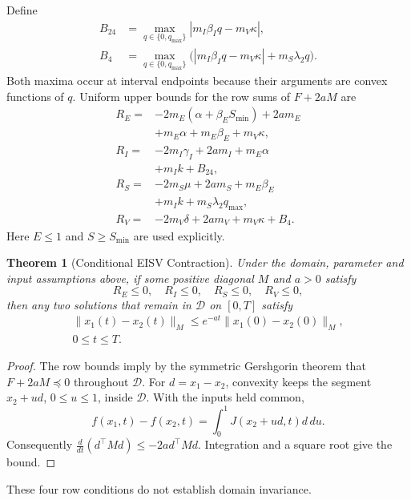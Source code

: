 \documentclass[11pt,twocolumn]{article}
\newtheorem{theorem}{Theorem}[section]
\begin{document}
Define
\begin{align*}
 B_{24}&=\max_{q\in\{0,q_{\max}\}}
             |m_I\beta_Iq-m_V\kappa|,\\
 B_4&=\max_{q\in\{0,q_{\max}\}}
       \bigl(|m_I\beta_Iq-m_V\kappa|+m_S\lambda_2q\bigr).
\end{align*}
Both maxima occur at interval endpoints because their arguments
are convex functions of $q$. Uniform upper bounds for the row
sums of $F+2aM$ are
\begin{align}
 R_E={}&-2m_E(\alpha+\beta_ES_{\min})+2am_E\nonumber\\
       &+m_E\alpha+m_E\beta_E+m_V\kappa,\label{eq:gersh-row1}\\
 R_I={}&-2m_I\gamma_I+2am_I+m_E\alpha\nonumber\\
       &+m_Ik+B_{24},\label{eq:gersh-row2}\\
 R_S={}&-2m_S\mu+2am_S+m_E\beta_E\nonumber\\
       &+m_Ik+m_S\lambda_2q_{\max},\label{eq:gersh-row3}\\
 R_V={}&-2m_V\delta+2am_V+m_V\kappa+B_4.\label{eq:gersh-row4}
\end{align}
Here $E\le1$ and $S\ge S_{\min}$ are used explicitly.

\begin{theorem}[Conditional EISV Contraction]
\label{thm:contraction}
Under the domain, parameter and input assumptions above, if some
positive diagonal $M$ and $a>0$ satisfy
\begin{equation}
 R_E\le0,\quad R_I\le0,\quad R_S\le0,\quad R_V\le0,
 \label{eq:contraction-sufficient}
\end{equation}
then any two solutions that remain in $\mathcal D$ on $[0,T]$
satisfy
\begin{equation}
 \begin{gathered}
 \|x_1(t)-x_2(t)\|_M\le e^{-at}\|x_1(0)-x_2(0)\|_M,\\
 0\le t\le T.
 \end{gathered}
 \label{eq:contraction-rate}
\end{equation}
\end{theorem}
\begin{proof}
The row bounds imply by the symmetric Gershgorin theorem that
$F+2aM\preceq0$ throughout $\mathcal D$. For $d=x_1-x_2$,
convexity keeps the segment $x_2+ud$, $0\le u\le1$, inside
$\mathcal D$. With the inputs held common,
\[
 f(x_1,t)-f(x_2,t)=\int_0^1 J(x_2+ud,t)d\,du.
\]
Consequently $\frac{d}{dt}(d^\top Md)\le-2a d^\top Md$.
Integration and a square root give the bound.
\end{proof}
These four row conditions do not establish domain invariance.
\end{document}
